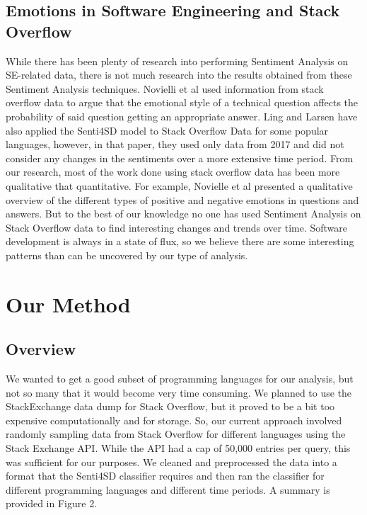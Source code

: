 \documentclass[conference]{IEEEtran}
\begin{document}
\subsection{Emotions in Software Engineering and Stack Overflow}
While there has been plenty of research into performing Sentiment Analysis on SE-related data, there is not much research into the results obtained from these Sentiment Analysis techniques. Novielli et al\cite{b33} used information from stack overflow data to argue that the emotional style of a technical question affects the probability of said question getting an appropriate answer.  Ling and Larsen\cite{b11} have also applied the Senti4SD model to Stack Overflow Data for some popular languages, however, in that paper, they used only data from 2017 and did not consider any changes in the sentiments over a more extensive time period. From our research, most of the work done using stack overflow data has been more qualitative that quantitative. For example, Novielle et al \cite{b34} presented a qualitative overview of the different types of positive and negative emotions in questions and answers. But to the best of our knowledge no one has used Sentiment Analysis on Stack Overflow data to find interesting changes and trends over time. Software development is always in a state of flux, so we believe there are some interesting patterns than can be uncovered by our type of analysis.\\

\section{Our Method}
 
\subsection{Overview}
We wanted to get a good subset of programming languages for our analysis, but not so many that it would become very time consuming. We planned to use the StackExchange data dump for Stack Overflow, but it proved to be a bit too expensive computationally and for storage. So, our current approach involved randomly sampling data from Stack Overflow for different languages using the Stack Exchange API. While the API had a cap of 50,000 entries per query, this was sufficient for our purposes. We cleaned and preprocessed the data into a format that the Senti4SD classifier requires and then ran the classifier for different programming languages and different time periods. A summary is provided in Figure 2.\\
\end{document}
